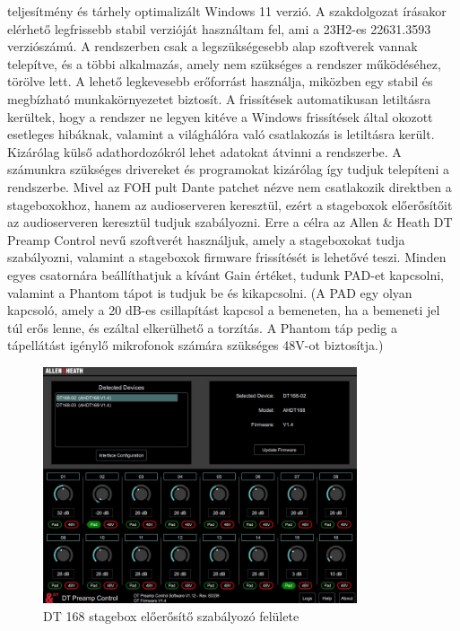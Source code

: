 teljesítmény és tárhely optimalizált Windows 11 verzió. A szakdolgozat írásakor elérhető legfrissebb stabil verzióját használtam fel, ami a
23H2-es 22631.3593 verziószámú.
A rendszerben csak a legszükségesebb alap szoftverek vannak telepítve, és a többi 
alkalmazás, amely nem szükséges a rendszer működéséhez, törölve lett. A lehető legkevesebb erőforrást használja, miközben egy stabil és megbízható
munkakörnyezetet biztosít. A frissítések automatikusan letiltásra kerültek, hogy a rendszer ne legyen kitéve a Windows frissítések által okozott
esetleges hibáknak, valamint a világhálóra való csatlakozás is letiltásra került. Kizárólag külső adathordozókról lehet adatokat átvinni a rendszerbe.
A számunkra szükséges drivereket és programokat kizárólag így tudjuk telepíteni a rendszerbe. 
Mivel az FOH pult Dante patchet nézve nem csatlakozik direktben a stageboxokhoz, hanem az audioserveren keresztül, ezért a stageboxok
előerősítőit az audioserveren keresztül tudjuk szabályozni. Erre a célra az Allen \& Heath DT Preamp Control nevű szoftverét használjuk,
amely a stageboxokat tudja szabályozni, valamint a stageboxok firmware frissítését is lehetővé teszi.
Minden egyes csatornára beállíthatjuk a kívánt Gain értéket, tudunk PAD-et kapcsolni, valamint a Phantom tápot is tudjuk be és kikapcsolni.
(A PAD egy olyan kapcsoló, amely a 20 dB-es csillapítást kapcsol a bemeneten, ha a bemeneti jel túl erős lenne, és ezáltal
elkerülhető a torzítás. A Phantom táp pedig a tápellátást igénylő mikrofonok számára szükséges 48V-ot biztosítja.)
\begin{figure}[H]
	\centering
	\includegraphics[width=350px, keepaspectratio]{figures/dt_preamp_control.jpg}
	\caption{DT 168 stagebox előerősítő szabályozó felülete}\label{fig:dt_preamp_control}
\end{figure}
